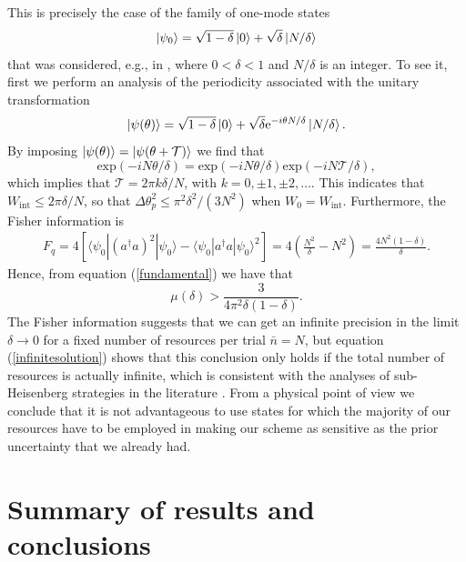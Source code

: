 This is precisely the case of the family of one-mode states
\begin{equation}
\ket{\psi_0} = \sqrt{1 - \delta}\ket{0} + \sqrt{\delta}\ket{N/\delta}
\label{infinite}
\end{equation}
that was considered, e.g., in \cite{alfredo2017}, where $0 < \delta < 1$ and $N/\delta$ is an integer. To see it, 
first we perform an analysis of the periodicity associated with the unitary transformation 
\begin{equation}
\ket{\psi(\theta)} = \sqrt{1-\delta}\ket{0} + \sqrt{\delta}\mathrm{e}^{-i\theta N/\delta}\ket{N/\delta}. 
\end{equation}
By imposing $\ket{\psi(\theta)} = \ket{\psi(\theta + \mathcal{T})}$ we find that
\begin{equation}
\mathrm{exp}\left(-i N\theta/\delta\right)=\mathrm{exp}\left(-i N\theta/\delta\right)\mathrm{exp}\left(-i N\mathcal{T}/\delta\right),
\end{equation}
which implies that $\mathcal{T} = 2\pi k\delta/N$, with $k = 0, \pm 1, \pm 2, \dots$. This indicates that $W_{\mathrm{int}} \leqslant 2\pi\delta/N$, so that $\Delta \theta^2_p \leqslant \pi^2 \delta^2/(3N^2)$ when $W_0 = W_\mathrm{int}$. Furthermore, the Fisher information is
\begin{eqnarray}
F_q = 4[ \langle \psi_0 | (a^\dagger a )^2 | \psi_0 \rangle - \langle \psi_0 | a^\dagger a  | \psi_0 \rangle^2] = 4\left(\frac{N^2}{\delta} - N^2 \right) = \frac{4N^2(1-\delta)}{\delta}.
\end{eqnarray}
Hence, from equation (\ref{fundamental}) we have that
\begin{equation}
\mu(\delta) > \frac{3}{4\pi^2 \delta (1- \delta)}.
\label{infinitesolution}
\end{equation}
The Fisher information suggests that we can get an infinite precision in the limit $\delta \rightarrow 0$ for a fixed number of resources per trial $\bar{n} = N$, but equation (\ref{infinitesolution}) shows that this conclusion only holds if the total number of resources is actually infinite, which is consistent with the analyses of sub-Heisenberg strategies in the literature \cite{tsang2012, berry2012infinite, hall2012}. From a physical point of view we conclude that it is not advantageous to use states for which the majority of our resources have to be employed in making our scheme as sensitive as the prior uncertainty that we already had.

\section{Summary of results and conclusions}

